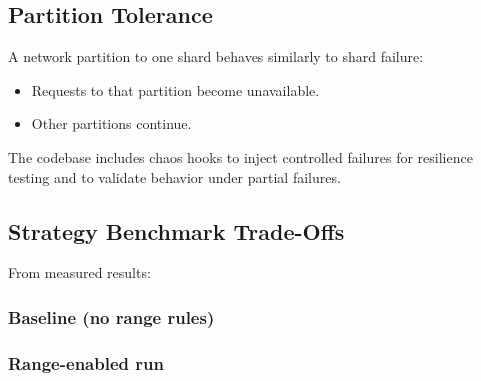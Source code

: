 \documentclass[12pt]{article}
\begin{document}
\subsection{Partition Tolerance}

A network partition to one shard behaves similarly to shard failure:
\begin{itemize}
    \item Requests to that partition become unavailable.
    \item Other partitions continue.
\end{itemize}

The codebase includes chaos hooks to inject controlled failures for resilience testing and to validate behavior under partial failures.

\subsection{Strategy Benchmark Trade-Offs}

From measured results:

\subsubsection*{Baseline (no range rules)}

\begin{table}[H]
\centering
\begin{minipage}{\textwidth}
\centering
{}
\end{minipage}
\end{table}

\subsubsection*{Range-enabled run}

\begin{table}[H]
\centering
\begin{minipage}{\textwidth}
\centering
{}
\end{minipage}
\end{table}
\end{document}
